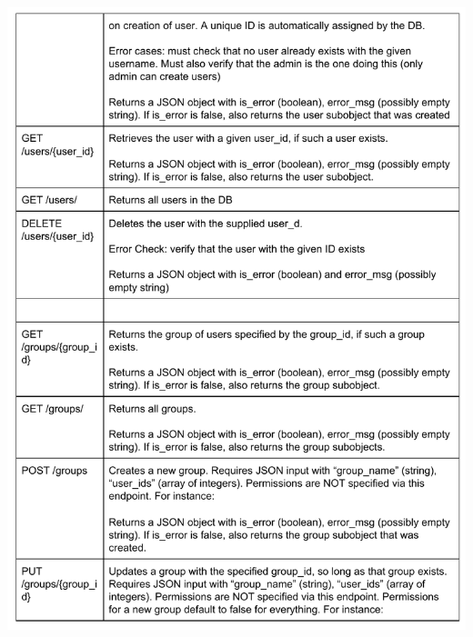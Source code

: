 \documentclass[12pt]{article}
\begin{document}
\includegraphics[width=6in]{apispec_05.pdf}
\end{document}
